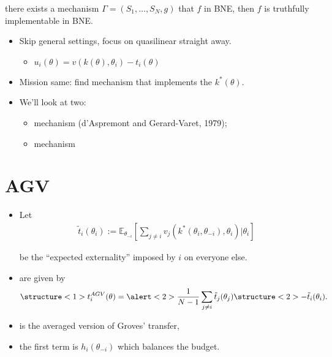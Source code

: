 \documentclass[english,handout,10pt]{beamer}		%
\def\lyxframeend{} %
\begin{document}
\begin{theorem}
	 there exists a mechanism $\Gamma=(S_{1},\dots,S_{N},g)$ that  $f$ in BNE, 
	\alert{then} $f$ is \alert{truthfully implementable} in BNE.
\end{theorem}
\lyxframeend


\begin{itemize}
	\item Skip general settings, focus on \alert{quasilinear} straight away.
	\begin{itemize}
		\item $u_i(\theta) = v(k(\theta),\theta_i) - t_i(\theta)$
	\end{itemize}
	\item Mission same: find mechanism that implements the  $k^*(\theta)$.
	\pause
	\item We'll look at two:
	\begin{itemize}
		\item {} mechanism (d'Aspremont and Gerard-Varet, 1979);
		\item {} mechanism
	\end{itemize}
\end{itemize}
\lyxframeend


\section{AGV}

\begin{itemize}
	\item Let 
	\vspace{-0.5em}\begin{align*}
	\tilde{t}_i (\theta_i) := \mathbb{E}_{\theta_{-i}} \left[ \sum_{j \neq i} v_j (k^*(\theta_i,\theta_{-i}), \theta_i) | \theta_i \right]
	\end{align*}
	
	be the ``expected externality'' imposed by $i$ on everyone else.
	\item {} are given by
	\vspace{-0.5em}\begin{align*}
	\structure<1>{t_i^{AGV} (\theta) = \alert<2>{\frac{1}{N-1} \sum_{j \neq i} \tilde{t}_j (\theta_j)} \structure<2>{- \tilde{t}_i (\theta_i)}}.
	\end{align*}\vspace{-1em}
	\pause
	\item {} is the averaged version of Groves' transfer,
	\item \alert{the first term} is $h_i(\theta_{-i})$ which balances the budget.
\end{itemize}
\lyxframeend
\end{document}
